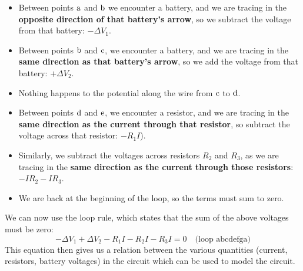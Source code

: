 \begin{itemize}
\item Between points ${\rm a}$ and ${\rm b}$ we encounter a battery, and we are tracing in the \textbf{opposite direction of that battery's arrow}, so we subtract the voltage from that battery: $-\Delta V_1$.
\item Between points ${\rm b}$ and ${\rm c}$, we encounter a battery, and we are tracing in the \textbf{same direction as that battery's arrow}, so we add the voltage from that battery: $+\Delta V_2$.
\item Nothing happens to the potential along the wire from ${\rm c}$ to ${\rm d}$.
\item Between points ${\rm d}$ and ${\rm e}$, we encounter a resistor, and we are tracing in the \textbf{same direction as the current through that resistor}, so subtract the voltage across that resistor: $-R_1I$).
\item Similarly, we subtract the voltages across resistors $R_2$ and $R_3$, as we are tracing in the \textbf{same direction as the current through those resistors}: $-IR_2 -IR_3$.
\item We are back at the beginning of the loop, so the terms must sum to zero.
\end{itemize}

We can now use the loop rule, which states that the sum of the above voltages must be zero:
\begin{equation}
-\Delta V_1 + \Delta V_2 - R_1I - R_2I - R_3I = 0\quad \text{(loop abcdefga)}
\end{equation}
This equation then gives us a relation between the various quantities (current, resistors, battery voltages) in the circuit which can be used to model the circuit.

